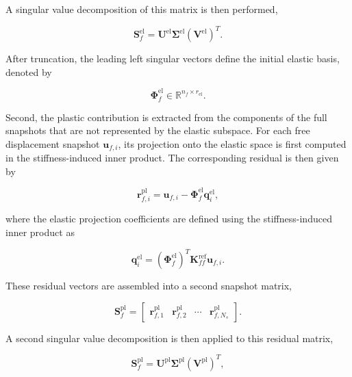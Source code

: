 \documentclass[11pt,a4paper]{article}
\begin{document}
A singular value decomposition of this matrix is then performed,

\begin{equation}
\mathbf{S}_f^{\mathrm{el}}
=
\mathbf{U}^{\mathrm{el}}
\mathbf{\Sigma}^{\mathrm{el}}
\left(\mathbf{V}^{\mathrm{el}}\right)^T .
\end{equation}

After truncation, the leading left singular vectors define the initial elastic basis, denoted by

\begin{equation}
\mathbf{\Phi}_{f}^{\mathrm{el}} \in \mathbb{R}^{n_f \times r_{\mathrm{el}}}.
\end{equation}

Second, the plastic contribution is extracted from the components of the full snapshots that are not represented by the elastic subspace. For each free displacement snapshot $\mathbf{u}_{f,i}$, its projection onto the elastic space is first computed in the stiffness-induced inner product. The corresponding residual is then given by

\begin{equation}
\mathbf{r}_{f,i}^{\mathrm{pl}}
=
\mathbf{u}_{f,i}
-
\mathbf{\Phi}_{f}^{\mathrm{el}}
\mathbf{q}_{i}^{\mathrm{el}},
\end{equation}

where the elastic projection coefficients are defined using the stiffness-induced inner product as

\begin{equation}
\mathbf{q}_{i}^{\mathrm{el}}
=
\left(\mathbf{\Phi}_{f}^{\mathrm{el}}\right)^T
\mathbf{K}_{ff}^{\mathrm{ref}}
\mathbf{u}_{f,i}.
\end{equation}

These residual vectors are assembled into a second snapshot matrix,

\begin{equation}
\mathbf{S}_f^{\mathrm{pl}}
=
\begin{bmatrix}
\mathbf{r}_{f,1}^{\mathrm{pl}} &
\mathbf{r}_{f,2}^{\mathrm{pl}} &
\cdots &
\mathbf{r}_{f,N_s}^{\mathrm{pl}}
\end{bmatrix}.
\end{equation}

A second singular value decomposition is then applied to this residual matrix,

\begin{equation}
\mathbf{S}_f^{\mathrm{pl}}
=
\mathbf{U}^{\mathrm{pl}}
\mathbf{\Sigma}^{\mathrm{pl}}
\left(\mathbf{V}^{\mathrm{pl}}\right)^T ,
\end{equation}
\end{document}
